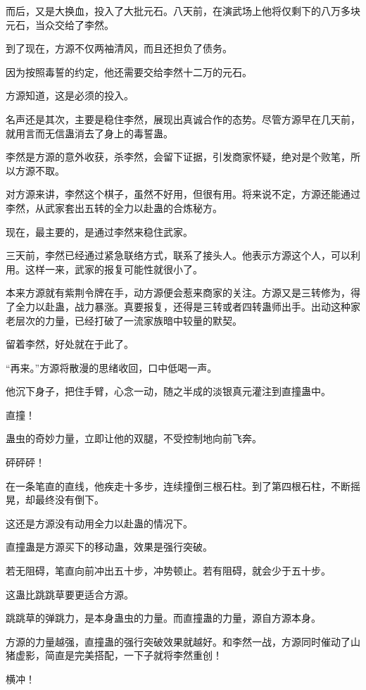\begin{this_body}
而后，又是大换血，投入了大批元石。八天前，在演武场上他将仅剩下的八万多块元石，当众交给了李然。

到了现在，方源不仅两袖清风，而且还担负了债务。

因为按照毒誓的约定，他还需要交给李然十二万的元石。

方源知道，这是必须的投入。

名声还是其次，主要是稳住李然，展现出真诚合作的态势。尽管方源早在几天前，就用言而无信蛊消去了身上的毒誓蛊。

李然是方源的意外收获，杀李然，会留下证据，引发商家怀疑，绝对是个败笔，所以方源不取。

对方源来讲，李然这个棋子，虽然不好用，但很有用。将来说不定，方源还能通过李然，从武家套出五转的全力以赴蛊的合炼秘方。

现在，最主要的，是通过李然来稳住武家。

三天前，李然已经通过紧急联络方式，联系了接头人。他表示方源这个人，可以利用。这样一来，武家的报复可能性就很小了。

本来方源就有紫荆令牌在手，动方源便会惹来商家的关注。方源又是三转修为，得了全力以赴蛊，战力暴涨。真要报复，还得是三转或者四转蛊师出手。出动这种家老层次的力量，已经打破了一流家族暗中较量的默契。

留着李然，好处就在于此了。

“再来。”方源将散漫的思绪收回，口中低喝一声。

他沉下身子，把住手臂，心念一动，随之半成的淡银真元灌注到直撞蛊中。

直撞！

蛊虫的奇妙力量，立即让他的双腿，不受控制地向前飞奔。

砰砰砰！

在一条笔直的直线，他疾走十多步，连续撞倒三根石柱。到了第四根石柱，不断摇晃，却最终没有倒下。

这还是方源没有动用全力以赴蛊的情况下。

直撞蛊是方源买下的移动蛊，效果是强行突破。

若无阻碍，笔直向前冲出五十步，冲势顿止。若有阻碍，就会少于五十步。

这蛊比跳跳草要更适合方源。

跳跳草的弹跳力，是本身蛊虫的力量。而直撞蛊的力量，源自方源本身。

方源的力量越强，直撞蛊的强行突破效果就越好。和李然一战，方源同时催动了山猪虚影，简直是完美搭配，一下子就将李然重创！

横冲！


\end{this_body}
